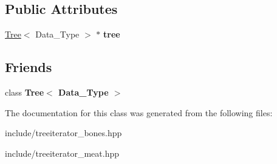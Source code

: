 \subsection*{Public Attributes}
\begin{DoxyCompactItemize}
\item 
\mbox{\label{classTreeIterator_ab21882c974833b21e28ef43c3d36c533}} 
\hyperlink{classTree}{Tree}$<$ Data\+\_\+\+Type $>$ $\ast$ {\bfseries tree}
\end{DoxyCompactItemize}
\subsection*{Friends}
\begin{DoxyCompactItemize}
\item 
\mbox{\label{classTreeIterator_a3beb724164e5ffbc68d03b553b7610c7}} 
class {\bfseries Tree$<$ Data\+\_\+\+Type $>$}
\end{DoxyCompactItemize}


The documentation for this class was generated from the following files\+:\begin{DoxyCompactItemize}
\item 
include/treeiterator\+\_\+bones.\+hpp\item 
include/treeiterator\+\_\+meat.\+hpp\end{DoxyCompactItemize}
